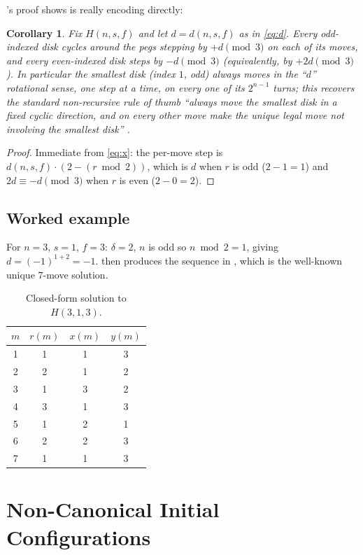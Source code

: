 \documentclass[11pt]{article}
\newtheorem{corollary}[theorem]{Corollary}
\begin{document}
's proof shows  is really encoding
 directly:

\begin{corollary}
\label{cor:direction}
Fix $H(n,s,f)$ and let $d = d(n,s,f)$ as in \eqref{eq:d}. Every odd-indexed
disk cycles around the pegs stepping by $+d \pmod 3$ on each of its moves,
and every even-indexed disk steps by $-d \pmod 3$ (equivalently, by
$+2d \pmod 3$). In particular the smallest disk (index $1$, odd) always
moves in the ``$d$'' rotational sense, one step at a time, on every one of
its $2^{n-1}$ turns; this recovers the standard non-recursive rule of thumb
``always move the smallest disk in a fixed cyclic direction, and on every
other move make the unique legal move not involving the smallest disk''
\cite{hinz2018}.
\end{corollary}

\begin{proof}
Immediate from \eqref{eq:x}: the per-move step is
$d(n,s,f) \cdot (2 - (r \bmod 2))$, which is $d$ when $r$ is odd
($2-1=1$) and $2d \equiv -d \pmod 3$ when $r$ is even ($2-0=2$).
\end{proof}

\subsection{Worked example}

For $n=3$, $s=1$, $f=3$: $\delta = 2$, $n$ is odd so $n\bmod2=1$, giving
$d = (-1)^{1+2} = -1$.  then produces the sequence in
, which is the well-known unique $7$-move solution.

\begin{table}[h]
\centering
\caption{Closed-form solution to $H(3,1,3)$.}
\label{tab:example}
\begin{tabular}{cccc}
\toprule
$m$ & $r(m)$ & $x(m)$ & $y(m)$ \\
\midrule
1 & 1 & 1 & 3 \\
2 & 2 & 1 & 2 \\
3 & 1 & 3 & 2 \\
4 & 3 & 1 & 3 \\
5 & 1 & 2 & 1 \\
6 & 2 & 2 & 3 \\
7 & 1 & 1 & 3 \\
\bottomrule
\end{tabular}
\end{table}

\section{Non-Canonical Initial Configurations}
\label{sec:general}
\end{document}
